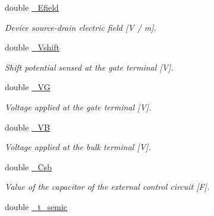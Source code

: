 \begin{DoxyCompactItemize}
\mbox{\label{class_probl_afad911eeef119fd9fd5f032c653402bb}} 
double \mbox{\hyperlink{class_probl_afad911eeef119fd9fd5f032c653402bb}{\+\_\+\+Efield}}
\begin{DoxyCompactList}\small\item\em Device source-\/drain electric field \mbox{[}V / m\mbox{]}. \end{DoxyCompactList}\item 
\mbox{\label{class_probl_ad4160e4357c48021d7f96a8499353a54}} 
double \mbox{\hyperlink{class_probl_ad4160e4357c48021d7f96a8499353a54}{\+\_\+\+Vshift}}
\begin{DoxyCompactList}\small\item\em Shift potential sensed at the gate terminal \mbox{[}V\mbox{]}. \end{DoxyCompactList}\item 
\mbox{\label{class_probl_ae52092839f1dc1dab7e6b076b0ee272b}} 
double \mbox{\hyperlink{class_probl_ae52092839f1dc1dab7e6b076b0ee272b}{\+\_\+\+VG}}
\begin{DoxyCompactList}\small\item\em Voltage applied at the gate terminal \mbox{[}V\mbox{]}. \end{DoxyCompactList}\item 
\mbox{\label{class_probl_ad42ca3b122970b9782a1b76349ec4b05}} 
double \mbox{\hyperlink{class_probl_ad42ca3b122970b9782a1b76349ec4b05}{\+\_\+\+VB}}
\begin{DoxyCompactList}\small\item\em Voltage applied at the bulk terminal \mbox{[}V\mbox{]}. \end{DoxyCompactList}\item 
\mbox{\label{class_probl_a7a8df6963bf80a8883d3818cf9b4d7e3}} 
double \mbox{\hyperlink{class_probl_a7a8df6963bf80a8883d3818cf9b4d7e3}{\+\_\+\+Csb}}
\begin{DoxyCompactList}\small\item\em Value of the capacitor of the external control circuit \mbox{[}F\mbox{]}. \end{DoxyCompactList}\item 
\mbox{\label{class_probl_ad8663cbe5d931041ea588344559b428a}} 
double \mbox{\hyperlink{class_probl_ad8663cbe5d931041ea588344559b428a}{\+\_\+t\+\_\+semic}}

\end{DoxyCompactItemize}
